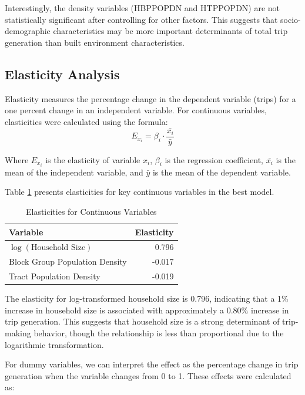 \documentclass[12pt]{article}
\begin{document}
Interestingly, the density variables (HBPPOPDN and HTPPOPDN) are not statistically significant after controlling for other factors. This suggests that socio-demographic characteristics may be more important determinants of total trip generation than built environment characteristics.

\subsection{Elasticity Analysis}

Elasticity measures the percentage change in the dependent variable (trips) for a one percent change in an independent variable. For continuous variables, elasticities were calculated using the formula:
\begin{equation}
E_{x_i} = \beta_i \cdot \frac{\bar{x_i}}{\bar{y}}
\end{equation}

Where $E_{x_i}$ is the elasticity of variable $x_i$, $\beta_i$ is the regression coefficient, $\bar{x_i}$ is the mean of the independent variable, and $\bar{y}$ is the mean of the dependent variable.

Table \ref{tab:elasticities} presents elasticities for key continuous variables in the best model.

\begin{table}[h]
\centering
\caption{Elasticities for Continuous Variables}
\label{tab:elasticities}
\begin{tabular}{lr}
\toprule
Variable & Elasticity \\
\midrule
$\log(\text{Household Size})$ & 0.796 \\
Block Group Population Density & -0.017 \\
Tract Population Density & -0.019 \\
\bottomrule
\end{tabular}
\end{table}

The elasticity for log-transformed household size is 0.796, indicating that a 1\% increase in household size is associated with approximately a 0.80\% increase in trip generation. This suggests that household size is a strong determinant of trip-making behavior, though the relationship is less than proportional due to the logarithmic transformation.

For dummy variables, we can interpret the effect as the percentage change in trip generation when the variable changes from 0 to 1. These effects were calculated as:
\end{document}
